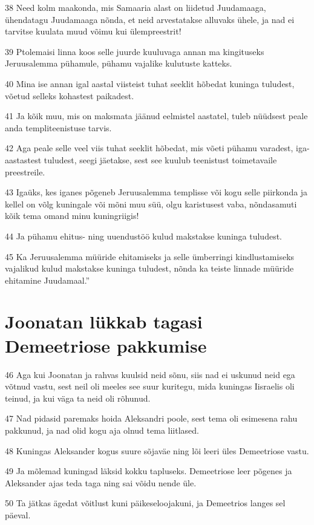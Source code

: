 \par 38 Need kolm maakonda, mis Samaaria alast on liidetud Juudamaaga, ühendatagu Juudamaaga nõnda, et neid arvestatakse alluvaks ühele, ja nad ei tarvitse kuulata muud võimu kui ülempreestrit!
\par 39 Ptolemaisi linna koos selle juurde kuuluvaga annan ma kingituseks Jeruusalemma pühamule, pühamu vajalike kulutuste katteks.
\par 40 Mina ise annan igal aastal viisteist tuhat seeklit hõbedat kuninga tuludest, võetud selleks kohastest paikadest.
\par 41 Ja kõik muu, mis on maksmata jäänud eelmistel aastatel, tuleb nüüdsest peale anda templiteenistuse tarvis.
\par 42 Aga peale selle veel viis tuhat seeklit hõbedat, mis võeti pühamu varadest, iga-aastastest tuludest, seegi jäetakse, sest see kuulub teenistust toimetavaile preestreile.
\par 43 Igaüks, kes iganes põgeneb Jeruusalemma templisse või kogu selle piirkonda ja kellel on võlg kuningale või mõni muu süü, olgu karistusest vaba, nõndasamuti kõik tema omand minu kuningriigis!
\par 44 Ja pühamu ehitus- ning uuendustöö kulud makstakse kuninga tuludest.
\par 45 Ka Jeruusalemma müüride ehitamiseks ja selle ümberringi kindlustamiseks vajalikud kulud makstakse kuninga tuludest, nõnda ka teiste linnade müüride ehitamine Juudamaal.” 

\section*{Joonatan lükkab tagasi Demeetriose pakkumise}

\par 46 Aga kui Joonatan ja rahvas kuulsid neid sõnu, siis nad ei uskunud neid ega võtnud vastu, sest neil oli meeles see suur kuritegu, mida kuningas Iisraelis oli teinud, ja kui väga ta neid oli rõhunud.
\par 47 Nad pidasid paremaks hoida Aleksandri poole, sest tema oli esimesena rahu pakkunud, ja nad olid kogu aja olnud tema liitlased.
\par 48 Kuningas Aleksander kogus suure sõjaväe ning lõi leeri üles Demeetriose vastu.
\par 49 Ja mõlemad kuningad läksid kokku tapluseks. Demeetriose leer põgenes ja Aleksander ajas teda taga ning sai võidu nende üle.
\par 50 Ta jätkas ägedat võitlust kuni päikeseloojakuni, ja Demeetrios langes sel päeval. 

